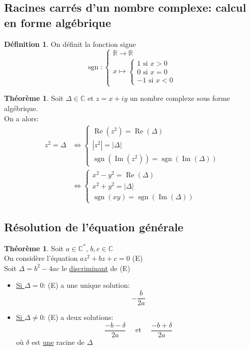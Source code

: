 \documentclass[10pt,a4paper]{article}
\theoremstyle{definition}
\newtheorem{theorem}[proposition]{Théorème}
\newtheorem{definition}[proposition]{Définition}
\DeclareMathOperator{\re}{Re}
\DeclareMathOperator{\im}{Im}
\DeclareMathOperator{\sgn}{sgn}
\begin{document}
\subsection{Racines carrés d'un nombre complexe: calcul en forme algébrique}
\begin{definition}
On définit la fonction signe
\[ \sgn: \begin{cases}
\mathbb{R} \to \mathbb{R} \\
x \mapsto \begin{cases}
1 \text{ si } x > 0 \\
0 \text{ si } x = 0 \\
-1 \text{ si } x < 0
\end{cases}
\end{cases} \]
\end{definition}

\pagebreak

\begin{theorem}
Soit $\Delta \in \mathbb{C}$ et $z = x + iy$ un nombre complexe sous forme algébrique. \\
On a alors:
\begin{align*}
z^2 = \Delta &\iff \begin{cases}
\re(z^2) = \re(\Delta) \\
|z^2| = |\Delta| \\
\sgn(\im(z^2)) = \sgn(\im(\Delta))
\end{cases} \\
&\iff \begin{cases}
x^2 - y^2 = \re(\Delta) \\
x^2 + y^2 = |\Delta| \\
\sgn(xy) = \sgn(\im(\Delta))
\end{cases}
\end{align*}
\end{theorem}

\subsection{Résolution de l'équation générale}
\begin{theorem}
Soit $a \in \mathbb{C}^*$, $b, c \in \mathbb{C}$ \\
On considère l'équation $az^2 + bz + c = 0$ (E) \\
Soit $\Delta = b^2 - 4ac$ le \uline{discriminant} de (E)
\begin{itemize}
\item \uline{Si $\Delta = 0$}: (E) a une unique solution:
\[-\frac{b}{2a}\]
\item \uline{Si $\Delta \neq 0$}: (E) a deux solutions:
\[ \frac{-b -\delta}{2a} \quad \text{ et } \quad \frac{-b +\delta}{2a} \]
où $\delta$ est \uline{une} racine de $\Delta$
\end{itemize}
\end{theorem}
\end{document}
